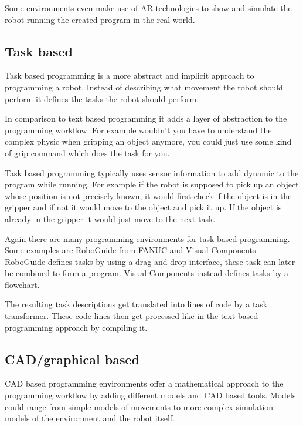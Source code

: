 \documentclass[conference]{IEEEtran}
\begin{document}
        Some environments even make use of AR technologies to show and simulate the robot running the created program in the real world.
        

    \subsection{Task based}

        Task based programming is a more abstract and implicit approach to programming a robot.
        Instead of describing what movement the robot should perform it defines the tasks the robot should perform.
       
        In comparison to text based programming it adds a layer of abstraction to the programming workflow. For example wouldn't you have to understand the complex physic when gripping an object anymore, you could just use some kind of grip command which does the task for you. %

        Task based programming typically uses sensor information to add dynamic to the program while running. For example if the robot is supposed to pick up an object whose position is not precisely known, it would first check if the object is in the gripper and if not it would move to the object and pick it up. If the object is already in the gripper it would just move to the next task.

        Again there are many programming environments for task based programming. Some examples are RoboGuide from FANUC and Visual Components. RoboGuide defines tasks by using a drag and drop interface, these task can later be combined to form a program.
        Visual Components instead defines tasks by a flowchart.

        The resulting task descriptions get translated into lines of code by a task transformer. These code lines then get processed like in the text based programming approach by compiling it. %
        

    \subsection{CAD/graphical based}

        CAD based programming environments offer a mathematical approach to the programming workflow by adding different models and CAD based tools.
        Models could range from simple models of movements to more complex simulation models of the environment and the robot itself. %
\end{document}
